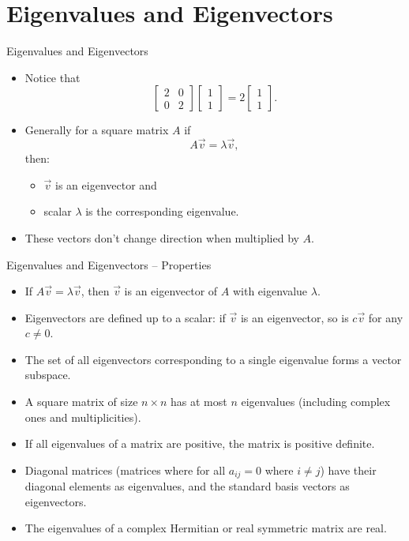 \documentclass{beamer}
\begin{document}
\section{Eigenvalues and Eigenvectors}
\begin{frame}{Eigenvalues and Eigenvectors}
  \begin{itemize}
    \item Notice that 
    \begin{equation}
        \begin{bmatrix} 2 & 0 \\ 0 & 2 \end{bmatrix}\begin{bmatrix} 1 \\ 1 \end{bmatrix} = 2\begin{bmatrix} 1 \\ 1 \end{bmatrix}. 
    \end{equation}
    \item Generally for a square matrix \(A\) if
    \begin{equation}
        A\vec{v} = \lambda \vec{v},
    \end{equation}
    then:
    \begin{itemize}
      \item $\vec{v}$ is an eigenvector and
      \item scalar $\lambda$ is the corresponding eigenvalue.
    \end{itemize}
    \item These vectors don't change direction when multiplied by $A$.
  \end{itemize}
\end{frame}

\begin{frame}{Eigenvalues and Eigenvectors – Properties}
  \begin{itemize}
    \item If $A \vec{v} = \lambda \vec{v}$, then $\vec{v}$ is an eigenvector of $A$ with eigenvalue $\lambda$.
    \item Eigenvectors are defined up to a scalar: if $\vec{v}$ is an eigenvector, so is $c\vec{v}$ for any $c \neq 0$.
    \item The set of all eigenvectors corresponding to a single eigenvalue forms a vector subspace.
    \item A square matrix of size $n \times n$ has at most $n$ eigenvalues (including complex ones and multiplicities).
    \item If all eigenvalues of a matrix are positive, the matrix is positive definite.
    \item Diagonal matrices (matrices where for all $a_{ij}=0$ where $i\neq j$) have their diagonal elements as eigenvalues, and the standard basis vectors as eigenvectors.
    \item The eigenvalues of a complex Hermitian or real symmetric matrix are real.
  \end{itemize}
\end{frame}
\end{document}

